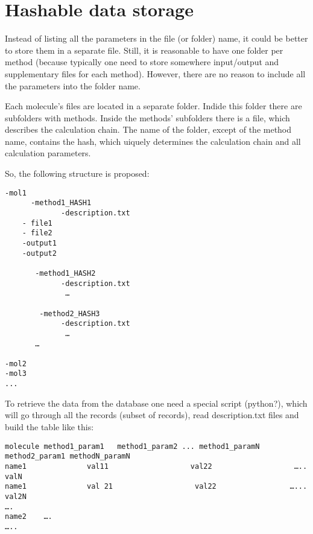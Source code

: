 \documentclass[12pt]{article}
\begin{document}

\section{Hashable data storage}

Instead of listing all the parameters in the file (or folder) name, it could be better to store them in a separate file.
Still, it is reasonable to have one folder per method (because typically one need to store somewhere input/output and supplementary files for each method).
However, there are no reason to include all the parameters into the folder name. 


Each molecule's files are located in a separate folder.
Indide this folder there are subfolders with methods.
Inside the methods' subfolders there is a file, which describes the calculation chain.
The name of the folder, except of the method name, contains the hash, which uiquely determines the calculation chain and all calculation parameters.

So, the following structure is proposed:

\begin{verbatim}
-mol1
      -method1_HASH1
             -description.txt
	- file1
	- file2
	-output1
	-output2
	
       -method1_HASH2
             -description.txt
              … 	 

        -method2_HASH3
             -description.txt
              … 
       … 

-mol2
-mol3
... 
\end{verbatim}

To retrieve the data from the database one need a special script (python?), which will go through all the records (subset of records), read description.txt files and build the table like this:

\begin{verbatim}
molecule method1_param1   method1_param2 ... method1_paramN   method2_param1 methodN_paramN
name1              val11                   val22                   …..                                                             valN
name1              val 21                   val22                 …...                                                             val2N
…. 
name2    ….
…..
\end{verbatim}
\end{document}
